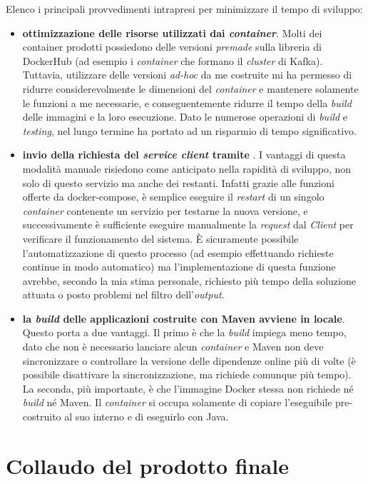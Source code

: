 \noindent
Elenco i principali provvedimenti intrapresi per minimizzare il tempo di sviluppo:
\begin{itemize}
  \item \textbf{ottimizzazione delle risorse utilizzati dai \textit{container}}.
  Molti dei container prodotti possiedono delle versioni \textit{premade} sulla libreria di DockerHub (ad esempio i \textit{container} che formano il \textit{cluster} di Kafka).
  Tuttavia, utilizzare delle versioni \textit{ad-hoc} da me costruite mi ha permesso di ridurre considerevolmente le dimensioni del \textit{container} e mantenere solamente le funzioni a me necessarie, e conseguentemente ridurre il tempo della \textit{build} delle immagini e la loro esecuzione. Dato le numerose operazioni di \textit{build} e \textit{testing}, nel lungo termine ha portato ad un risparmio di tempo significativo.
  \item \textbf{invio della richiesta  del \textit{service client} tramite }.
  I vantaggi di questa modalità manuale risiedono come anticipato nella rapidità di sviluppo, non solo di questo servizio ma anche dei restanti.
  Infatti grazie alle funzioni offerte da docker-compose, è semplice eseguire il \textit{restart} di un singolo \textit{container} contenente un servizio per testarne la nuova versione, e successivamente è sufficiente eseguire manualmente la \textit{request} dal  \textit{Client} per verificare il funzionamento del sistema.
  È sicuramente possibile l'automatizzazione di questo processo (ad esempio effettuando richieste continue in modo automatico) ma l'implementazione di questa funzione avrebbe, secondo la mia stima personale, richiesto più tempo della soluzione attuata o posto problemi nel filtro dell'\textit{output}.
  \item \textbf{la \textit{build} delle applicazioni costruite con Maven avviene in locale}.
  Questo porta a due vantaggi.
  Il primo è che la \textit{build} impiega meno tempo, dato che non è necessario lanciare alcun \textit{container} e Maven non deve sincronizzare o controllare la versione delle dipendenze online più di volte (è possibile  disattivare la sincronizzazione, ma richiede comunque più tempo).
  La seconda, più importante, è che l'immagine Docker stessa non richiede né \textit{build} né Maven.
  Il \textit{container} si occupa solamente di copiare l'eseguibile pre-costruito al suo interno e di eseguirlo con Java.
\end{itemize}

\section{Collaudo del prodotto finale}

